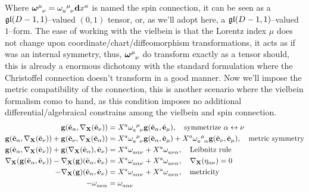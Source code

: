 Where $\tensor{{\boldsymbol\omega}}{^\mu_\nu}=\tensor{\omega}{_a^\mu_\nu}\vb dx^a$ is named the spin connection, it can be seen as a $\mathfrak{gl}\qty(D-1,1)$--valued $(0,1)$ tensor, 
or, as we'll adopt here, a $\mathfrak{gl}\qty(D-1,1)$--valued $1$--form.
The ease of working with the vielbein is that the Lorentz index $\mu$ 
does not change upon coordinate/chart/diffeomorphism transformations, it acts as if was an internal symmetry, thus, 
$\tensor{{\boldsymbol\omega}}{^\mu_\nu}$ do transform exactly as a tensor should, this is already a enormous dichotomy 
with the standard formulation where the Christoffel connection doesn't transform in a good manner.
Now we'll impose the metric compatibility of the connection, 
this is another scenario where the vielbein formalism como to hand, as this condition imposes no additional differential/algebraical constrains among the vielbein and spin connection.
\begin{align*}
    \vb g\qty(\tilde{\vb e}_\alpha,\nabla_{\vb X}\qty(\tilde{\vb e}_\nu))&=X^a\tensor{\omega}{_a^\mu_\nu}\vb g\qty(\tilde{\vb e}_\alpha,\tilde{\vb e}_\mu),\ \ \ \textnormal{symmetrize }\alpha\leftrightarrow\nu\\
    \vb g\qty(\tilde{\vb e}_\alpha,\nabla_{\vb X}\qty(\tilde{\vb e}_\nu))+\vb g\qty(\tilde{\vb e}_\nu,\nabla_{\vb X}\qty(\tilde{\vb e}_\alpha))&=X^a\tensor{\omega}{_a^\mu_\nu}\vb g\qty(\tilde{\vb e}_\alpha,\tilde{\vb e}_\mu)+X^a\tensor{\omega}{_a^\mu_\alpha}\vb g\qty(\tilde{\vb e}_\nu,\tilde{\vb e}_\mu),\ \ \ \textnormal{metric symmetry}\\
    \vb g\qty(\tilde{\vb e}_\alpha,\nabla_{\vb X}\qty(\tilde{\vb e}_\nu))+\vb g\qty(\nabla_{\vb X}\qty(\tilde{\vb e}_\alpha),\tilde{\vb e}_\nu)&=X^a\tensor{\omega}{_a_\alpha_\nu}+X^a\tensor{\omega}{_a_\nu_\alpha},\ \ \ \textnormal{Leibnitz rule}\\
    \nabla_{\vb X}\qty(\vb g\qty(\tilde{\vb e}_\alpha,\tilde{\vb e}_\nu))-\nabla_{\vb X}\qty(\vb g)\qty(\tilde{\vb e}_\alpha,\tilde{\vb e}_\nu)&=X^a\tensor{\omega}{_a_\alpha_\nu}+X^a\tensor{\omega}{_a_\nu_\alpha},\ \ \ \nabla_{\vb X}\qty(\eta_{\alpha\nu})=0\\
    -\nabla_{\vb X}\qty(\vb g)\qty(\tilde{\vb e}_\alpha,\tilde{\vb e}_\nu)&=X^a\tensor{\omega}{_a_\alpha_\nu}+X^a\tensor{\omega}{_a_\nu_\alpha},\ \ \ \textnormal{metricity}\\
    -\tensor{\omega}{_a_\nu_\alpha}&=\tensor{\omega}{_a_\alpha_\nu}
\end{align*}

